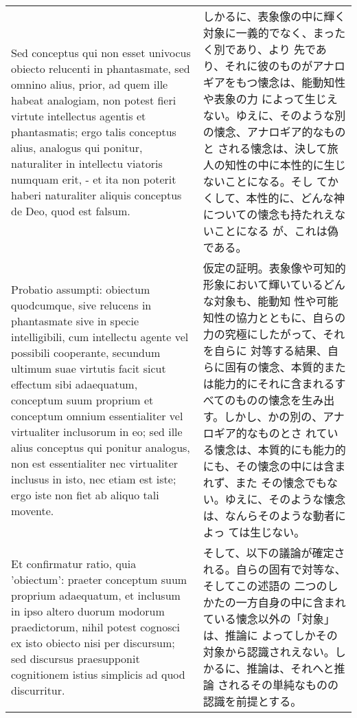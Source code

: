 \documentclass[paper=a4paper,fontsize=10pt,jafontsize=9pt,titlepage]{jlreq}
\begin{document}
\begin{longtable}{p{21em}p{21em}}
 \\


 Sed conceptus qui non esset univocus obiecto relucenti in
 phantasmate, sed omnino alius, prior, ad quem ille habeat analogiam,
 non potest fieri virtute intellectus agentis et phantasmatis; ergo
 talis conceptus alius, analogus qui ponitur, naturaliter in
 intellectu viatoris numquam erit, - et ita non poterit haberi
 naturaliter aliquis conceptus de Deo, quod est falsum.

 &

 しかるに、表象像の中に輝く対象に一義的でなく、まったく別であり、より
 先であり、それに彼のものがアナロギアをもつ懐念は、能動知性や表象の力
 によって生じえない。ゆえに、そのような別の懐念、アナロギア的なものと
 される懐念は、決して旅人の知性の中に本性的に生じないことになる。そし
 てかくして、本性的に、どんな神についての懐念も持たれえないことになる
 が、これは偽である。

 \\


 Probatio assumpti: obiectum quodcumque, sive relucens in
 phantasmate sive in specie intelligibili, cum intellectu agente vel
 possibili cooperante, secundum ultimum suae virtutis facit sicut
 effectum sibi adaequatum, conceptum suum proprium et conceptum omnium
 essentialiter vel virtualiter inclusorum in eo; sed ille alius
 conceptus qui ponitur analogus, non est essentialiter nec virtualiter
 inclusus in isto, nec etiam est iste; ergo iste non fiet ab aliquo
 tali movente.

 &

 仮定の証明。表象像や可知的形象において輝いているどんな対象も、能動知
 性や可能知性の協力とともに、自らの力の究極にしたがって、それを自らに
 対等する結果、自らに固有の懐念、本質的または能力的にそれに含まれるす
 べてのものの懐念を生み出す。しかし、かの別の、アナロギア的なものとさ
 れている懐念は、本質的にも能力的にも、その懐念の中には含まれず、また
 その懐念でもない。ゆえに、そのような懐念は、なんらそのような動者によっ
 ては生じない。

 \\

 Et confirmatur ratio, quia 'obiectum': praeter conceptum suum
 proprium adaequatum, et inclusum in ipso altero duorum modorum
 praedictorum, nihil potest cognosci ex isto obiecto nisi per
 discursum; sed discursus praesupponit cognitionem istius simplicis ad
 quod discurritur.


 &

 そして、以下の議論が確定される。自らの固有で対等な、そしてこの述語の
 二つのしかたの一方自身の中に含まれている懐念以外の「対象」は、推論に
 よってしかその対象から認識されえない。しかるに、推論は、それへと推論
 されるその単純なものの認識を前提とする。


\end{longtable}
\end{document}
